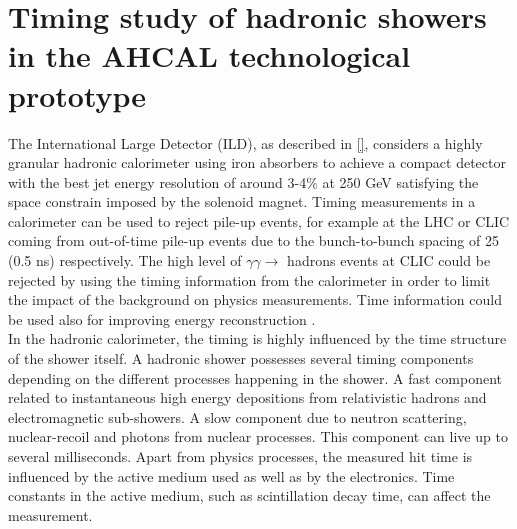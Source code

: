 {}
\chapter*{Timing study of hadronic showers in the AHCAL technological prototype}
\label{chap:TimingAHCAL}

The International Large Detector (ILD), as described in \ref{}, considers a highly granular hadronic calorimeter using iron absorbers to achieve a compact detector with the best jet energy resolution of around 3-4\% at 250 GeV satisfying the space constrain imposed by the solenoid magnet. Timing measurements in a calorimeter can be used to reject pile-up events, for example at the LHC or CLIC coming from out-of-time pile-up events due to the bunch-to-bunch spacing of 25 (0.5 ns) respectively. The high level of $\gamma\gamma \rightarrow$ hadrons events at CLIC could be rejected by using the timing information from the calorimeter in order to limit the impact of the background on physics measurements. Time information could be used also for improving energy reconstruction \cite{Benaglia2016}.\\

In the hadronic calorimeter, the timing is highly influenced by the time structure of the shower itself. A hadronic shower possesses several timing components depending on the different processes happening in the shower. A fast component related to instantaneous high energy depositions from relativistic hadrons and electromagnetic sub-showers. A slow component due to neutron scattering, nuclear-recoil and photons from nuclear processes. This component can live up to several milliseconds. Apart from physics processes, the measured hit time is influenced by the active medium used as well as by the electronics. Time constants in the active medium, such as scintillation decay time, can affect the measurement.\\

